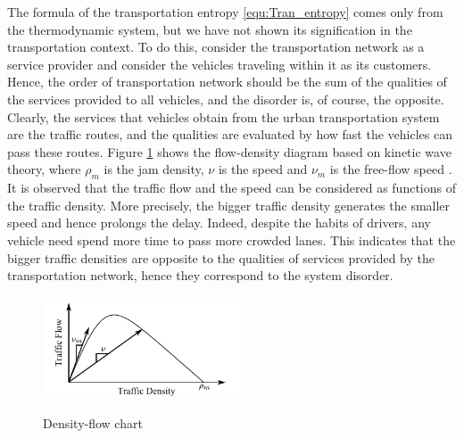 \documentclass[preprint,authoryear,12pt]{elsarticle}
\begin{document}

The formula of the transportation entropy \eqref{equ:Tran_entropy} comes only from the thermodynamic system, but we have not shown its signification in the transportation context. To do this, consider the transportation network as a service provider and consider the vehicles traveling within it as its customers. Hence, the order of transportation network should be the sum of the qualities of the services provided to all vehicles, and the disorder is, of course, the opposite. Clearly, the services that vehicles obtain from the urban transportation system are the traffic routes, and the qualities are evaluated by how fast the vehicles can pass these routes. Figure \ref{fig:d_q} shows the flow-density diagram based on kinetic wave theory, where $\rho_m$ is the jam density, $\nu$ is the speed and $\nu_m$ is the free-flow speed \citep{ukkusuri_robust_2010}. It is observed that the traffic flow and the speed can be considered as functions of the traffic density. More precisely, the bigger traffic density generates the smaller speed and hence prolongs the delay. Indeed, despite the habits of drivers, any vehicle need spend more time to pass more crowded lanes. This indicates that the bigger traffic densities are opposite to the qualities of services provided by the transportation network, hence they correspond to the system disorder.

\begin{figure}[ht]
  \centering
  \includegraphics[height=3cm]{pics/d-q}\\
  \caption{Density-flow chart}
  \label{fig:d_q}
\end{figure}
\end{document}
